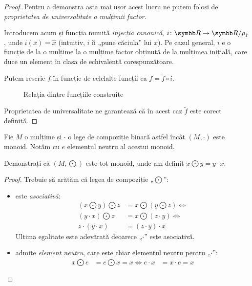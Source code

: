 \begin{proof}
Pentru a demonstra asta mai ușor acest lucru ne putem folosi de \emph{proprietatea de universalitate a mulțimii factor}.

Introducem acum și funcția numită \emph{injecția canonică}, \(\function{i}{\reals}{\reals/\rho_f}\), unde \(i(x) = \widehat{x}\) (intuitiv, \(i\) îi „pune căciula” lui \(x\)). Pe cazul general, \(i\) e o funcție de la o mulțime la o mulțime factor obținută de la mulțimea inițială, care duce un element în clasa de echivalență corespunzătoare.

Putem rescrie \(f\) în funcție de celelalte funcții ca \(f = \tilde{f} \circ i\).

\begin{figure}[h]
    \centering
    \caption*{Relația dintre funcțiile construite}
\end{figure}

Proprietatea de universalitate ne garantează că în acest caz \(\tilde{f}\) este corect definită.
\end{proof}

\begin{exercise}
Fie \(M\) o mulțime și \(\cdot\) o lege de compoziție binară astfel încât \((M, \cdot)\) este monoid. Notăm cu \(e\) elementul neutru al acestui monoid.

Demonstrați că \((M, \bigodot)\) este tot monoid, unde am definit \(x \bigodot y = y \cdot x\).
\end{exercise}
\begin{proof}
Trebuie să arătăm că legea de compoziție „\(\bigodot\)”:
\begin{itemize}
    \item este \emph{asociativă}:
    \begin{align*}
        (x \bigodot y) \bigodot z &= x \bigodot (y \bigodot z) \iff \\
        (y \cdot x) \bigodot z &= x \bigodot (z \cdot y) \iff \\
        z \cdot (y \cdot x) &= (z \cdot y) \cdot x
    \end{align*}
    Ultima egalitate este adevărată deoarece „\(\cdot\)” este asociativă.
    \item admite \emph{element neutru}, care este chiar elementul neutru pentru „\(\cdot\)”:
    \begin{align*}
        x \bigodot e &= e \bigodot x = x \iff e \cdot x &= x \cdot e = x
    \end{align*}
\end{itemize}
\end{proof}

